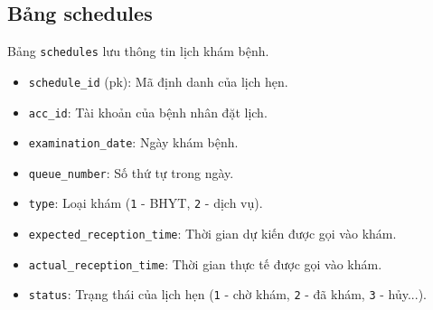 \subsection{Bảng schedules}
Bảng \texttt{schedules} lưu thông tin lịch khám bệnh.
\begin{itemize}
  \item \texttt{schedule\_id} (pk): Mã định danh của lịch hẹn.
  \item \texttt{acc\_id}: Tài khoản của bệnh nhân đặt lịch.
  \item \texttt{examination\_date}: Ngày khám bệnh.
  \item \texttt{queue\_number}: Số thứ tự trong ngày.
  \item \texttt{type}: Loại khám (\texttt{1} - BHYT, \texttt{2} - dịch vụ).
  \item \texttt{expected\_reception\_time}: Thời gian dự kiến được gọi vào khám.
  \item \texttt{actual\_reception\_time}: Thời gian thực tế được gọi vào khám.
  \item \texttt{status}: Trạng thái của lịch hẹn (\texttt{1} - chờ khám, \texttt{2} - đã khám, \texttt{3} - hủy...).
\end{itemize}